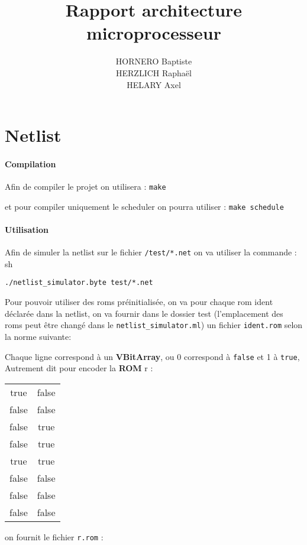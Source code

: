 \documentclass{article}
\title{Rapport architecture microprocesseur}
\author{HORNERO Baptiste \\ HERZLICH Raphaël \\ HELARY Axel}
\date{}
\begin{document}
\maketitle

\part*{Netlist}

\subsection*{Compilation}

Afin de compiler le projet on utilisera : \verb|make| 

et pour compiler uniquement le scheduler on pourra utiliser : \verb|make schedule| 


\subsection*{Utilisation}

Afin de simuler la netlist sur le fichier \verb|/test/*.net| on va utiliser la commande : 
sh
\begin{verbatim}./netlist_simulator.byte test/*.net\end{verbatim}

Pour pouvoir utiliser des roms préinitialisée, on va pour chaque rom ident déclarée dans la netlist,
on va fournir dans le dossier test (l'emplacement des roms peut être changé dans le \verb|netlist_simulator.ml|)
un fichier \verb|ident.rom| selon la norme suivante:

Chaque ligne correspond à un \textbf{VBitArray}, ou 0 correspond à \verb|false| et 1 à \verb|true|, Autrement dit pour encoder la \textbf{ROM} r : 

\begin{tabular}{| c | c |}
    true & false \\
    false & false \\
    false & true \\
    false & true \\
    true & true \\
    false & false \\
    false & false \\
    false & false \\
\end{tabular}

on fournit le fichier \verb|r.rom| :
\end{document}
